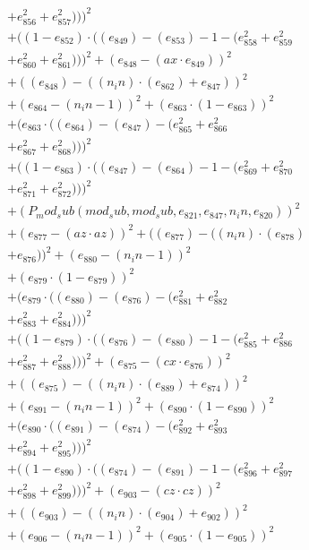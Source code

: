 \documentclass[10pt, a4paper]{article}
\begin{document}
\begin{align*}
& + e_{856}^{2} + e_{857}^{2})))^{2} \\
& + ((1 - e_{852})  \cdot  ((e_{849}) - (e_{853}) - 1 - (e_{858}^{2} + e_{859}^{2} \\
& + e_{860}^{2} + e_{861}^{2})))^{2} + (e_{848} - (ax  \cdot  e_{849}))^{2} \\
& + ((e_{848}) - ((n_in)  \cdot  (e_{862}) + e_{847}))^{2} \\
& + (e_{864} - (n_in - 1))^{2} + (e_{863}  \cdot  (1 - e_{863}))^{2} \\
& + (e_{863}  \cdot  ((e_{864}) - (e_{847}) - (e_{865}^{2} + e_{866}^{2} \\
& + e_{867}^{2} + e_{868}^{2})))^{2} \\
& + ((1 - e_{863})  \cdot  ((e_{847}) - (e_{864}) - 1 - (e_{869}^{2} + e_{870}^{2} \\
& + e_{871}^{2} + e_{872}^{2})))^{2} \\
& + (P_mod_sub(mod_sub, mod_sub, e_{821}, e_{847}, n_in, e_{820}))^{2} \\
& + (e_{877} - (az  \cdot  az))^{2} + ((e_{877}) - ((n_in)  \cdot  (e_{878}) \\
& + e_{876}))^{2} + (e_{880} - (n_in - 1))^{2} \\
& + (e_{879}  \cdot  (1 - e_{879}))^{2} \\
& + (e_{879}  \cdot  ((e_{880}) - (e_{876}) - (e_{881}^{2} + e_{882}^{2} \\
& + e_{883}^{2} + e_{884}^{2})))^{2} \\
& + ((1 - e_{879})  \cdot  ((e_{876}) - (e_{880}) - 1 - (e_{885}^{2} + e_{886}^{2} \\
& + e_{887}^{2} + e_{888}^{2})))^{2} + (e_{875} - (cx  \cdot  e_{876}))^{2} \\
& + ((e_{875}) - ((n_in)  \cdot  (e_{889}) + e_{874}))^{2} \\
& + (e_{891} - (n_in - 1))^{2} + (e_{890}  \cdot  (1 - e_{890}))^{2} \\
& + (e_{890}  \cdot  ((e_{891}) - (e_{874}) - (e_{892}^{2} + e_{893}^{2} \\
& + e_{894}^{2} + e_{895}^{2})))^{2} \\
& + ((1 - e_{890})  \cdot  ((e_{874}) - (e_{891}) - 1 - (e_{896}^{2} + e_{897}^{2} \\
& + e_{898}^{2} + e_{899}^{2})))^{2} + (e_{903} - (cz  \cdot  cz))^{2} \\
& + ((e_{903}) - ((n_in)  \cdot  (e_{904}) + e_{902}))^{2} \\
& + (e_{906} - (n_in - 1))^{2} + (e_{905}  \cdot  (1 - e_{905}))^{2} \\

\end{align*}
\end{document}
